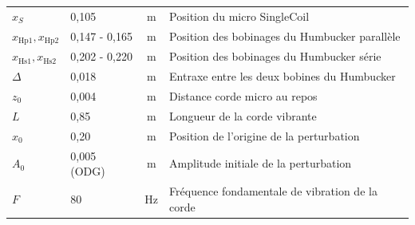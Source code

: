 \documentclass[a4paper,11pt]{article}
\begin{document}
\begin{center}
\begin{tabularx}{\textwidth}{llcX}
\midrule
$x_{S}$ & 0,105 & m & Position du micro SingleCoil \\
$x_{\text{Hp1}}, x_{\text{Hp2}}$ & 0,147 - 0,165 & m & Position des bobinages du Humbucker parallèle \\
$x_{\text{Hs1}}, x_{\text{Hs2}}$ & 0,202 - 0,220 & m & Position des bobinages du Humbucker série \\
$\Delta$ & 0,018 & m & Entraxe entre les deux bobines du Humbucker \\
\midrule
$z_{0}$ & 0,004 & m & Distance corde micro au repos \\
$L$ & 0,85 & m & Longueur de la corde vibrante \\
$x_{0}$ & 0,20 & m & Position de l'origine de la perturbation \\
$A_{0}$ & 0,005 (ODG) & m & Amplitude initiale de la perturbation \\
$F$ & 80 & Hz & Fréquence fondamentale de vibration de la corde \\
\bottomrule
\end{tabularx}
\end{center}
\end{document}
